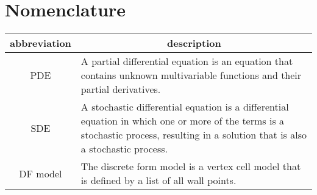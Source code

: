\section*{Nomenclature}

\begin{table}[h!]
\centering
\begin{tabular}{c p{12cm}} %
\hline
\textbf{abbreviation} & \multicolumn{1}{c}{\textbf{description}}\\ 
\midrule
PDE &  A partial differential equation is an equation that contains unknown multivariable functions and their partial derivatives. \\
SDE &  A stochastic differential equation is a differential equation in which one or more of the terms is a stochastic process, resulting in a solution that is also a stochastic process. \\
DF model & The discrete form model is a vertex cell model that is defined by a list of all wall points. \\
\bottomrule
\end{tabular}
\end{table}

